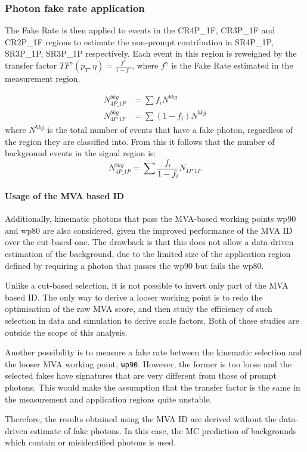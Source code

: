 \subsubsection{Photon fake rate application}
The Fake Rate is then applied to events in the CR4P\_1F, CR3P\_1F and CR2P\_1F regions to estimate the non-prompt contribution in SR4P\_1P, SR3P\_1P, SR3P\_1P respectively.
Each event in this region is reweighed by the transfer factor $TF^\gamma(p_T, \eta) = \frac{f^\gamma}{1-f^\gamma}$, where $f^\gamma$ is the Fake Rate estimated in the measurement region.

\begin{equation}
  \begin{split}
    \label{eq:fakeRate_explanation_part1}
    N^{bkg}_{4P\_1P} &= \sum f_i N^{bkg}
    \\
    N^{bkg}_{4P\_1F} &= \sum ( 1-f_i ) N^{bkg}
  \end{split}
\end{equation}
where $N^{bkg}$ is the total number of events that have a fake photon, regardless of the region they are classified into.
From this it follows that the number of background events in the signal region is:
\begin{equation}
  \label{eq:fakeRate_explanation_part2}
  N^{bkg}_{4P\_1P} = \sum \frac{f_i}{1-f_i} N_{4P\_1F}
\end{equation}

\paragraph{Usage of the MVA based ID\\}
Additionally, kinematic photons that pass the MVA-based working points wp90 and wp80 are also considered,
given the improved performance of the MVA ID over the cut-based one.
The drawback is that this does not allow a data-driven estimation of the \nonprompt background,
due to the limited size of the application region defined by requiring a photon that passes the wp90 but fails the wp80.

Unlike a cut-based selection, it is not possible to invert only part of the MVA based ID.
The only way to derive a looser working point is to redo the optimisation of the raw MVA score,
and then study the efficiency of such selection in data and simulation to derive scale factors.
Both of these studies are outside the scope of this analysis.

Another possibility is to measure a fake rate between the kinematic selection and the looser MVA working point, \texttt{wp90}.
However, the former is too loose and the selected fakes have signatures that are very different from those of prompt photons.
This would make the assumption that the transfer factor is the same in the measurement and application regions quite unstable.


Therefore, the results obtained using the MVA ID are derived without the data-driven estimate of fake photons.
In this case, the MC prediction of backgrounds which contain \nonprompt or misidentified photons is used.
